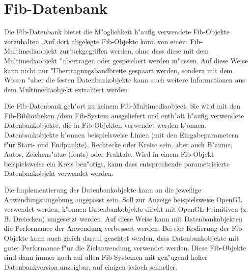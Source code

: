 %
%
%
%



\newpage
\part{Fib-Datenbank}
\label{partFibDatabase}

Die Fib-Datenbank bietet die M"oglichkeit h"aufig verwendete Fib-Objekte vorzuhalten. Auf dort abgelegte Fib-Objekte kann von einem Fib-Multimediaobjekt zur"uckgegriffen werden, ohne dass diese mit dem Multimediaobjekt "ubertragen oder gespeichert werden m"ussen. Auf diese Weise kann nicht nur "Ubertragungsbandbreite 
gespaart werden, sondern mit dem Wissen "uber die festen Datenbankobjekte kann auch weitere Informationen aus dem Multimediaobjekt extrahiert werden.

Die Fib-Datenbank geh"ort zu keinem Fib-Multimediaobject. Sie wird mit den Fib-Bib\-lio\-the\-ken /dem Fib-System ausgeliefert und enth"alt h"aufig verwendete Datenbankobjekte, die in Fib-Objekten verwendet werden k"onnen. Datenbankobjekte k"onnen beispielsweise Linien (mit den Eingabeparametern f"ur Start- und Endpunkte), Recht\-ecke oder Kreise sein, aber auch B"aume, Autos, Zeichens"atze (fonts) oder Fraktale. Wird in einem Fib-Objekt beispielsweise ein Kreis ben"otigt, kann dass entsprechende parametrisierte Datenbankobjekt verwendet werden.

Die Implementierung der Datenbankobjekte kann an die jeweilige Anwendungsumgebung angepasst sein. Soll zur Anzeige beispielsweise OpenGL verwendet werden, k"onnen Datenbankobjekte direkt mit OpenGL-Primitiven (z. B. Dreiecken) umgesetzt werden. Auf diese Weise kann mit Datenbankobjekten die Performance der Anwendung verbessert werden. Bei der Kodierung der Fib-Objekte kann auch gleich darauf geachtet werden, dass Datenbankobjekte mit guter Performance f"ur die Zielanwendung verwendet werden. Diese Fib-Objekte sind dann immer noch auf allen Fib-Systemen mit gen"ugend hoher Datenbankversion anzeigbar, auf einigen jedoch schneller.

